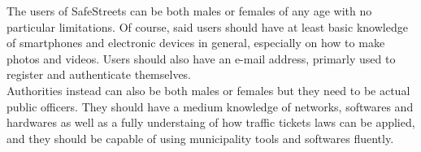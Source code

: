 The users of SafeStreets can be both males or females of any age with no particular limitations. Of course, said users should have at least basic knowledge of smartphones and electronic devices in general, especially on how to make photos and videos.
Users should also have an e-mail address, primarly used to register and authenticate themselves.\\
Authorities instead can also be both males or females but they need to be actual public officers.
They should have a medium knowledge of networks, softwares and hardwares as well as a fully understaing of how traffic tickets laws can be applied, and they should be capable of using municipality tools and softwares fluently.